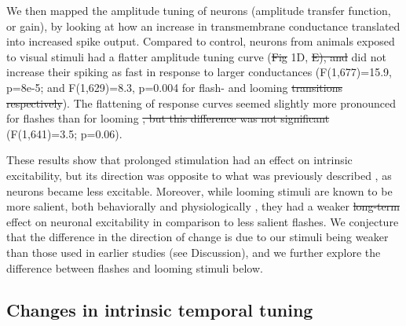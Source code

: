 \documentclass{article}
\providecommand{\DIFaddtex}[1]{{\protect\color{blue}{#1}}} %
\providecommand{\DIFdeltex}[1]{{\protect\color{red}\sout{#1}}}                      %
\providecommand{\DIFaddbegin}{} %
\providecommand{\DIFaddend}{} %
\providecommand{\DIFdelbegin}{} %
\providecommand{\DIFdelend}{} %
\providecommand{\DIFadd}[1]{\texorpdfstring{\DIFaddtex{#1}}{#1}} %
\providecommand{\DIFdel}[1]{\texorpdfstring{\DIFdeltex{#1}}{}} %
\newcommand{\DIFscaledelfig}{0.5}
\newlength{\DIFdelgraphicswidth} %
\newlength{\DIFdelgraphicsheight} %
\newcommand{\DIFaddincludegraphics}[2][]{{\color{blue}\fbox{\DIFOincludegraphics[#1]{#2}}}} %
\newcommand{\DIFdelincludegraphics}[2][]{%
\sbox{\DIFdelgraphicsbox}{\DIFOincludegraphics[#1]{#2}}%
\settoboxwidth{\DIFdelgraphicswidth}{\DIFdelgraphicsbox} %
\settoboxtotalheight{\DIFdelgraphicsheight}{\DIFdelgraphicsbox} %
\scalebox{\DIFscaledelfig}{%
\parbox[b]{\DIFdelgraphicswidth}{\usebox{\DIFdelgraphicsbox}\\[-\baselineskip] \rule{\DIFdelgraphicswidth}{0em}}\llap{\resizebox{\DIFdelgraphicswidth}{\DIFdelgraphicsheight}{%
\setlength{\unitlength}{\DIFdelgraphicswidth}%
\begin{picture}(1,1)%
\thicklines\linethickness{2pt} %
{\color[rgb]{1,0,0}\put(0,0){\framebox(1,1){}}}%
{\color[rgb]{1,0,0}\put(0,0){\line( 1,1){1}}}%
{\color[rgb]{1,0,0}\put(0,1){\line(1,-1){1}}}%
\end{picture}%
}\hspace*{3pt}}} %
} %
\DeclareRobustCommand{\DIFaddbegin}{\DIFOaddbegin \let\includegraphics\DIFaddincludegraphics} %
\DeclareRobustCommand{\DIFaddend}{\DIFOaddend \let\includegraphics\DIFOincludegraphics} %
\DeclareRobustCommand{\DIFdelbegin}{\DIFOdelbegin \let\includegraphics\DIFdelincludegraphics} %
\DeclareRobustCommand{\DIFdelend}{\DIFOaddend \let\includegraphics\DIFOincludegraphics} %
\begin{document}
We then mapped the amplitude tuning of neurons (\DIFaddbegin \DIFadd{their }\DIFaddend amplitude transfer function, or gain), by looking at how an increase in transmembrane conductance translated into increased spike output. Compared to control, neurons from animals exposed to visual stimuli had a flatter amplitude tuning curve (\DIFdelbegin \DIFdel{Fig }\DIFdelend \DIFaddbegin \DIFadd{less of a difference between columns of Figure }\DIFaddend 1D, \DIFdelbegin \DIFdel{E), and }\DIFdelend \DIFaddbegin \DIFadd{or between curves in each individual panel of Figure 1E), as they }\DIFaddend did not increase their spiking as fast in response to larger conductances (F(1,677)=15.9, p=8e-5; and F(1,629)=8.3, p=0.004 for flash- and looming \DIFdelbegin \DIFdel{transitions respectively}\DIFdelend \DIFaddbegin \DIFadd{respectively, compared to control}\DIFaddend ). The flattening of response curves seemed slightly more pronounced for flashes than for looming \DIFdelbegin \DIFdel{, but this difference was not significant }\DIFdelend (F(1,641)=3.5; p=0.06). 

These results show that prolonged stimulation had an effect on intrinsic excitability, but its direction was opposite to what was previously described \citep{aizenman2003,ciarleglio2015}, as neurons became less excitable. Moreover, while looming stimuli are known to be more salient, both behaviorally and physiologically \citep{khakhalin2014}, they had a weaker \DIFdelbegin \DIFdel{long-term }\DIFdelend effect on neuronal excitability in comparison to less salient flashes. We conjecture that the difference in the direction of change is due to our stimuli being weaker than those used in earlier studies (see Discussion), and we further explore the difference between flashes and looming stimuli below.

\subsection*{Changes in intrinsic temporal tuning}
\end{document}
